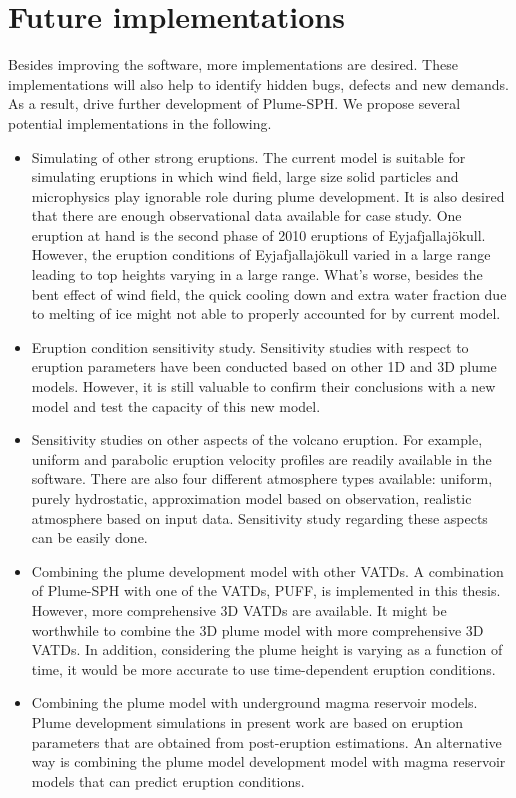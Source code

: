 \section{Future implementations}
Besides improving the software, more implementations are desired. These implementations will also help to identify hidden bugs, defects and new demands. As a result, drive further development of Plume-SPH.
We propose several potential implementations in the following.
\begin{itemize}
\item Simulating of other strong eruptions. The current model is suitable for simulating eruptions in which wind field, large size solid particles and microphysics play ignorable role during plume development. It is also desired that there are enough observational data available for case study. One eruption at hand is the second phase of 2010 eruptions of Eyjafjallajökull. However, the eruption conditions of Eyjafjallajökull varied in a large range leading to top heights varying in a large range. What's worse, besides the bent effect of wind field, the quick cooling down and extra water fraction due to melting of ice might not able to properly accounted for by current model.
\item Eruption condition sensitivity study. Sensitivity studies with respect to eruption parameters have been conducted based on other 1D and 3D plume models. However, it is still valuable to confirm their conclusions with a new model and test the capacity of this new model.
\item Sensitivity studies on other aspects of the volcano eruption. For example, uniform and parabolic eruption velocity profiles are readily available in the software. There are also four different atmosphere types available: uniform, purely hydrostatic, approximation model based on observation, realistic atmosphere based on input data. Sensitivity study regarding these aspects can be easily done.
\item Combining the plume development model with other VATDs. A combination of Plume-SPH with one of the VATDs, PUFF, is implemented in this thesis. However, more comprehensive 3D VATDs are available. It might be worthwhile to combine the 3D plume model with more comprehensive 3D VATDs. In addition, considering the plume height is varying as a function of time, it would be more accurate to use time-dependent eruption conditions.
\item Combining the plume model with underground magma reservoir models. Plume development simulations in present work are based on eruption parameters that are obtained from post-eruption estimations. An alternative way is combining the plume model development model with magma reservoir models that can predict eruption conditions.

\end{itemize}
